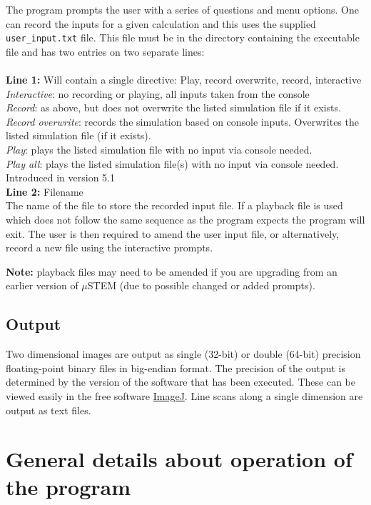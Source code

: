 \documentclass[12pt,a4paper]{article}
\begin{document}
The program prompts the user with a series of questions and menu options.
One can record the inputs for a given calculation and this uses the supplied \verb|user_input.txt| file.
This file must be in the directory containing the executable file and has two entries on two separate lines: \\ \\
{\bf Line 1:} Will contain a single directive: Play, record overwrite, record, interactive \\
\emph {Interactive}: no recording or playing, all inputs taken from the console \\
\emph {Record}: as above, but does not overwrite the listed simulation file if it exists. \\
\emph {Record overwrite}: records the simulation based on console inputs. Overwrites the listed simulation file (if it exists). \\
\emph {Play}: plays the listed simulation file with no input via console needed. \\
\emph {Play all}: plays the listed simulation file(s) with no input via console needed. Introduced in version 5.1\\
{\bf Line 2:} Filename \\
The name of the file to store the recorded input file.
If a playback file is used which does not  follow the same sequence as the program expects the program will exit. 
The user is then required to amend the user input file, or alternatively, record a new file using the interactive prompts.

{\bf Note:} playback files may need to be amended if you are upgrading from an earlier version of $\mu$STEM (due to possible changed or added prompts).
%
\subsection{Output}\label{output}
Two dimensional images are output as single (32-bit) or double (64-bit) precision floating-point binary files in big-endian format.
The precision of the output is determined by the version of the software that has been executed. These can be viewed easily in the free software \href{http://imagej.nih.gov/ij/}{ImageJ}.
Line scans along a single dimension are output as text files.




\section{General details about operation of the program}
\end{document}
